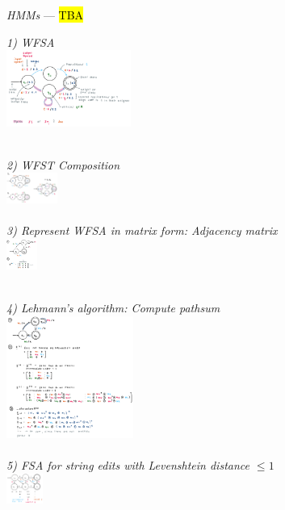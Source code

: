 \emph{HMMs} --- 
\hl{TBA}

\textit{1) WFSA}\\
\includegraphics[height=25mm]{inhalt/images/NLP/06_wfsa_1.png}
\\\\
\begin{multicols}{2}
\textit{2) WFST Composition}\\
\includegraphics[height=10mm]{inhalt/images/NLP/06_wfsa_2.png}
\\\\
\textit{3) Represent WFSA in matrix form: Adjacency matrix}\\
\includegraphics[height=10mm]{inhalt/images/NLP/06_wfsa_3.png}\\\\
\end{multicols}
\textit{4) Lehmann's algorithm: Compute pathsum}\\
\includegraphics[height=40mm]{inhalt/images/NLP/06_wfsa_4.png}\\\\
\textit{5) FSA for string edits with Levenshtein distance $\leq 1$}\\
\includegraphics[height=10mm]{inhalt/images/NLP/06_wfsa_5.png}